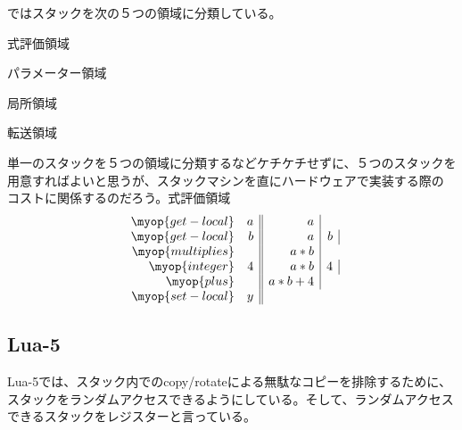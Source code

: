 {	\cite{shannon2006}ではスタックを次の５つの領域に分類している。
	\begin{description}\setlength{\itemsep}{-1mm} %
		\item[e-stack] 式評価領域
		\item[p-stack] パラメーター領域
		\item[l-stack] 局所領域
		\item[x-stack] 転送領域
		\item[その他]
	\end{description} %
	単一のスタックを５つの領域に分類するなどケチケチせずに、５つのスタックを
	用意すればよいと思うが、スタックマシンを直にハードウェアで実装する際の
	コストに関係するのだろう。式評価領域
	\begin{equation*}\begin{array}{rr||r|r|}
		\myop{get-local} & a & a \\
		\myop{get-local} & b & a & b \\
		\myop{multiplies} & & a * b \\
		\myop{integer} & 4 & a * b & 4 \\
		\myop{plus} & & a * b + 4 \\
		\myop{set-local} & y \\
	\end{array}\end{equation*}
\subsection{Lua-5}\label{s2:Lua-5} %
	Lua-5では、スタック内でのcopy/rotateによる無駄なコピーを排除するために、
	スタックをランダムアクセスできるようにしている。そして、ランダムアクセス
	できるスタックをレジスターと言っている。
\endgroup %
}
